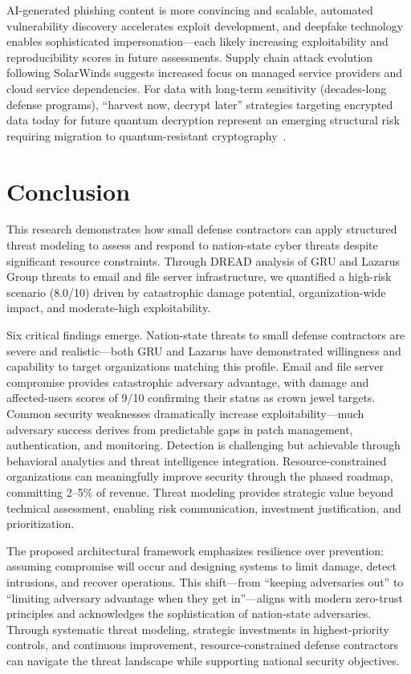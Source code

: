 \documentclass[sigconf,nonacm]{acmart}
\begin{document}
AI-generated phishing content is more convincing and scalable, automated vulnerability
discovery accelerates exploit development, and deepfake technology enables sophisticated
impersonation---each likely increasing exploitability and reproducibility scores in
future assessments. Supply chain attack evolution following SolarWinds suggests increased
focus on managed service providers and cloud service dependencies. For data with
long-term sensitivity (decades-long defense programs), ``harvest now, decrypt later''
strategies targeting encrypted data today for future quantum decryption represent an
emerging structural risk requiring migration to quantum-resistant
cryptography~\cite{nist2024sp800171}.

\section{Conclusion}
\sloppy

This research demonstrates how small defense contractors can apply structured threat
modeling to assess and respond to nation-state cyber threats despite significant resource
constraints. Through DREAD analysis of GRU and Lazarus Group threats to email and file
server infrastructure, we quantified a high-risk scenario (8.0/10) driven by
catastrophic damage potential, organization-wide impact, and moderate-high exploitability.

Six critical findings emerge. Nation-state threats to small defense contractors are
severe and realistic---both GRU and Lazarus have demonstrated willingness and capability
to target organizations matching this profile. Email and file server compromise provides
catastrophic adversary advantage, with damage and affected-users scores of 9/10
confirming their status as crown jewel targets. Common security weaknesses dramatically
increase exploitability---much adversary success derives from predictable gaps in patch
management, authentication, and monitoring. Detection is challenging but achievable
through behavioral analytics and threat intelligence integration. Resource-constrained
organizations can meaningfully improve security through the phased roadmap, committing
2--5\% of revenue. Threat modeling provides strategic value beyond technical
assessment, enabling risk communication, investment justification, and prioritization.

The proposed architectural framework emphasizes resilience over prevention: assuming
compromise will occur and designing systems to limit damage, detect intrusions, and
recover operations. This shift---from ``keeping adversaries out'' to ``limiting
adversary advantage when they get in''---aligns with modern zero-trust principles and
acknowledges the sophistication of nation-state adversaries. Through systematic threat modeling,
strategic investments in highest-priority controls, and continuous improvement,
resource-constrained defense contractors can navigate the threat landscape while
supporting national security objectives.
\end{document}
